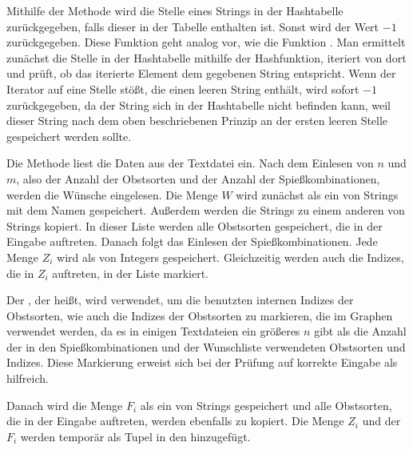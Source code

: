 Mithilfe der Methode  wird die Stelle eines Strings in der Hashtabelle zurückgegeben, 
falls dieser in der Tabelle enthalten ist. Sonst wird der Wert $-1$ zurückgegeben.
Diese Funktion geht analog vor, wie die Funktion .
Man ermittelt zunächst die Stelle in der Hashtabelle mithilfe der Hashfunktion,
iteriert von dort und prüft, ob das iterierte Element dem gegebenen String entspricht.
Wenn der Iterator auf eine Stelle stößt, die einen leeren String enthält,
wird sofort $-1$ zurückgegeben, da der String sich in der Hashtabelle nicht befinden kann,
weil dieser String nach dem oben beschriebenen Prinzip an der ersten leeren Stelle 
gespeichert werden sollte.

Die Methode  liest die Daten aus der Textdatei ein. 
Nach dem Einlesen von $n$ und $m$, also der Anzahl der Obstsorten und der Anzahl der Spießkombinationen,
werden die Wünsche eingelesen.
Die Menge $W$ wird zunächst als ein  von Strings mit dem Namen  gespeichert.
Außerdem werden die Strings zu einem anderen  von Strings  kopiert.
In dieser Liste werden alle Obstsorten gespeichert, die in der Eingabe auftreten. 
Danach folgt das Einlesen der Spießkombinationen.
Jede Menge $Z_i$ wird als  von Integers gespeichert.
Gleichzeitig werden auch die Indizes, die in $Z_i$ auftreten, in der Liste  markiert.

Der , der  heißt, wird verwendet, um die benutzten internen Indizes der Obstsorten,
wie auch die Indizes der Obstsorten zu markieren, die im Graphen verwendet werden,
da es in einigen Textdateien ein größeres $n$ gibt als die Anzahl der in den Spießkombinationen 
und der Wunschliste verwendeten Obstsorten und Indizes. 
Diese Markierung erweist sich bei der Prüfung auf korrekte Eingabe als hilfreich.

Danach wird die Menge $F_i$ als ein  von Strings gespeichert und 
alle Obstsorten, die in der Eingabe auftreten, werden ebenfalls zu  kopiert.
Die Menge $Z_i$ und der  $F_i$ werden temporär als Tupel in den 
 hinzugefügt.

